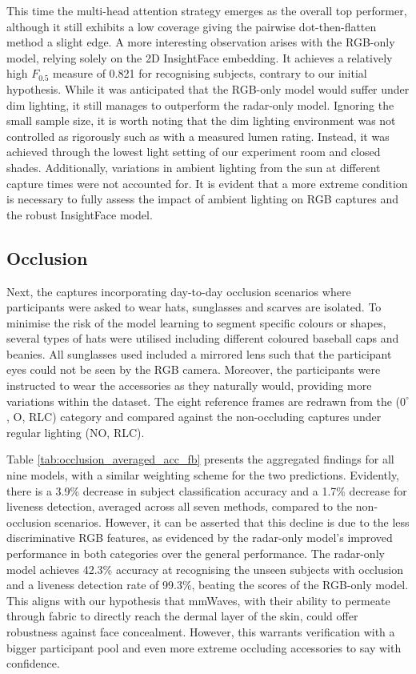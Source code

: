 \documentclass{mpaper}
\begin{document}
This time the multi-head attention strategy emerges as the overall top performer, although it still exhibits a low coverage giving the pairwise dot-then-flatten method a slight edge. A more interesting observation arises with the RGB-only model, relying solely on the 2D InsightFace embedding. It achieves a relatively high $F_{0.5}$ measure of 0.821 for recognising subjects, contrary to our initial hypothesis. While it was anticipated that the RGB-only model would suffer under dim lighting, it still manages to outperform the radar-only model. Ignoring the small sample size, it is worth noting that the dim lighting environment was not controlled as rigorously such as with a measured lumen rating. Instead, it was achieved through the lowest light setting of our experiment room and closed shades. Additionally, variations in ambient lighting from the sun at different capture times were not accounted for. It is evident that a more extreme condition is necessary to fully assess the impact of ambient lighting on RGB captures and the robust InsightFace model.


\subsection{Occlusion}
Next, the captures incorporating day-to-day occlusion scenarios where participants were asked to wear hats, sunglasses and scarves are isolated. To minimise the risk of the model learning to segment specific colours or shapes, several types of hats were utilised including different coloured baseball caps and beanies. All sunglasses used included a mirrored lens such that the participant eyes could not be seen by the RGB camera. Moreover, the participants were instructed to wear the accessories as they naturally would, providing more variations within the dataset. The eight reference frames are redrawn from the ($0^\circ$, O, RLC) category and compared against the non-occluding captures under regular lighting (NO, RLC).

Table \ref{tab:occlusion_averaged_acc_fb} presents the aggregated findings for all nine models, with a similar weighting scheme for the two predictions. Evidently, there is a 3.9\% decrease in subject classification accuracy and a 1.7\% decrease for liveness detection, averaged across all seven methods, compared to the non-occlusion scenarios. However, it can be asserted that this decline is due to the less discriminative RGB features, as evidenced by the radar-only model's improved performance in both categories over the general performance. The radar-only model achieves 42.3\% accuracy at recognising the unseen subjects with occlusion and a liveness detection rate of 99.3\%, beating the scores of the RGB-only model. This aligns with our hypothesis that mmWaves, with their ability to permeate through fabric to directly reach the dermal layer of the skin, could offer robustness against face concealment. However, this warrants verification with a bigger participant pool and even more extreme occluding accessories to say with confidence.
\end{document}
